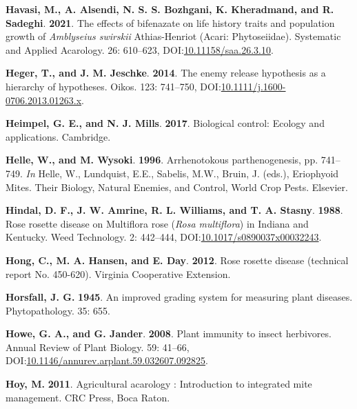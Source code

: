 \documentclass[12pt,final,CPage]{ufthesis}
\newlength{\cslhangindent}
\newenvironment{CSLReferences}[2] %
{%
	\setlength{\parindent}{0pt}
	\ifodd #1 \everypar{\setlength{\hangindent}{\cslhangindent}}\ignorespaces\fi
	\ifnum #2 > 0
	\setlength{\parskip}{#2\baselineskip}
	\fi
}%
{}
\begin{document}
{\begin{CSLReferences}{1}{0}
  \leavevmode{}%
  \textbf{Havasi, M., A. Alsendi, N. S. S. Bozhgani, K. Kheradmand, and R. Sadeghi}. \textbf{2021}. The effects of bifenazate on life history traits and population growth of {\emph{Amblyseius swirskii}} {Athias-Henriot} ({Acari}: {Phytoseiidae}). Systematic and Applied Acarology. 26: 610--623, DOI:\href{https://doi.org/10.11158/saa.26.3.10}{10.11158/saa.26.3.10}.

  \leavevmode{}%
  \textbf{Heger, T., and J. M. Jeschke}. \textbf{2014}. The enemy release hypothesis as a hierarchy of hypotheses. Oikos. 123: 741--750, DOI:\href{https://doi.org/10.1111/j.1600-0706.2013.01263.x}{10.1111/j.1600-0706.2013.01263.x}.

  \leavevmode{}%
  \textbf{Heimpel, G. E., and N. J. Mills}. \textbf{2017}. Biological control: Ecology and applications. Cambridge.

  \leavevmode{}%
  \textbf{Helle, W., and M. Wysoki}. \textbf{1996}. Arrhenotokous parthenogenesis, pp. 741--749. \emph{In} Helle, W., Lundquist, E.E., Sabelis, M.W., Bruin, J. (eds.), Eriophyoid Mites. Their Biology, Natural Enemies, and Control, World Crop Pests. Elsevier.

  \leavevmode{}%
  \textbf{Hindal, D. F., J. W. Amrine, R. L. Williams, and T. A. Stasny}. \textbf{1988}. {Rose rosette disease} on {Multiflora rose} ({\emph{Rosa multiflora}}) in {Indiana} and {Kentucky}. Weed Technology. 2: 442--444, DOI:\href{https://doi.org/10.1017/s0890037x00032243}{10.1017/s0890037x00032243}.

  \leavevmode{}%
  \textbf{Hong, C., M. A. Hansen, and E. Day}. \textbf{2012}. {Rose rosette disease} (technical report No. 450-620). Virginia Cooperative Extension.

  \leavevmode{}%
  \textbf{Horsfall, J. G.} \textbf{1945}. An improved grading system for measuring plant diseases. Phytopathology. 35: 655.

  \leavevmode{}%
  \textbf{Howe, G. A., and G. Jander}. \textbf{2008}. Plant immunity to insect herbivores. Annual Review of Plant Biology. 59: 41--66, DOI:\href{https://doi.org/10.1146/annurev.arplant.59.032607.092825}{10.1146/annurev.arplant.59.032607.092825}.

  \leavevmode{}%
  \textbf{Hoy, M.} \textbf{2011}. Agricultural acarology : Introduction to integrated mite management. CRC Press, Boca Raton.


\end{CSLReferences}}
\end{document}
